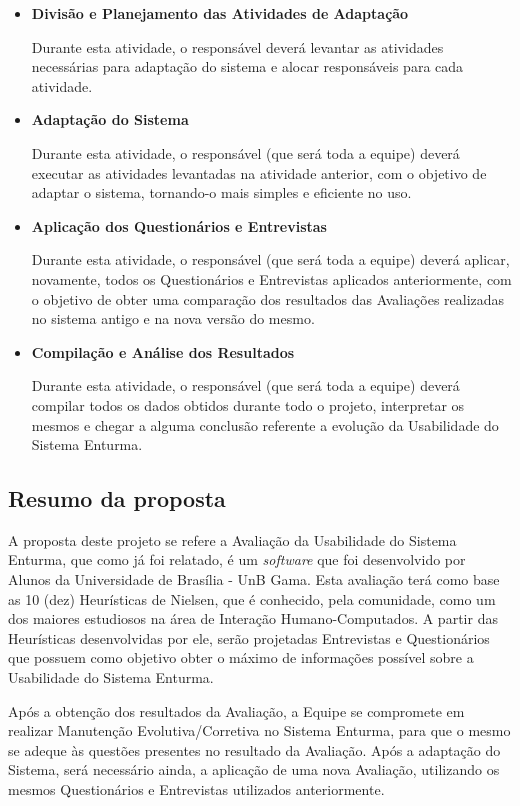 \begin{itemize}
		\item \textbf{Divisão e Planejamento das Atividades de Adaptação}

			Durante esta atividade, o responsável deverá levantar as atividades necessárias para adaptação do sistema e alocar responsáveis para cada atividade.

		\item \textbf{Adaptação do Sistema}

			Durante esta atividade, o responsável (que será toda a equipe) deverá executar as atividades levantadas na atividade anterior, com o objetivo de adaptar o sistema, tornando-o mais simples e eficiente no uso.

		\item \textbf{Aplicação dos Questionários e Entrevistas}

			Durante esta atividade, o responsável (que será toda a equipe) deverá aplicar, novamente, todos os Questionários e Entrevistas aplicados anteriormente, com o objetivo de obter uma comparação dos resultados das Avaliações realizadas no sistema antigo e na nova versão do mesmo.

		\item \textbf{Compilação e Análise dos Resultados}

			Durante esta atividade, o responsável (que será toda a equipe) deverá compilar todos os dados obtidos durante todo o projeto, interpretar os mesmos e chegar a alguma conclusão referente a evolução da Usabilidade do Sistema Enturma.
	\end{itemize}

\subsection{Resumo da proposta}
	
	A proposta deste projeto se refere a Avaliação da Usabilidade do Sistema Enturma, que como já foi relatado, é um \textit{software} que foi desenvolvido por Alunos da Universidade de Brasília - UnB Gama. Esta avaliação terá como base as 10 (dez) Heurísticas de Nielsen, que é conhecido, pela comunidade, como um dos maiores estudiosos na área de Interação Humano-Computados. A partir das Heurísticas desenvolvidas por ele, serão projetadas Entrevistas e Questionários que possuem como objetivo obter o máximo de informações possível sobre a Usabilidade do Sistema Enturma.

	Após a obtenção dos resultados da Avaliação, a Equipe se compromete em realizar Manutenção Evolutiva/Corretiva no Sistema Enturma, para que o mesmo se adeque às questões presentes no resultado da Avaliação. Após a adaptação do Sistema, será necessário ainda, a aplicação de uma nova Avaliação, utilizando os mesmos Questionários e Entrevistas utilizados anteriormente.


